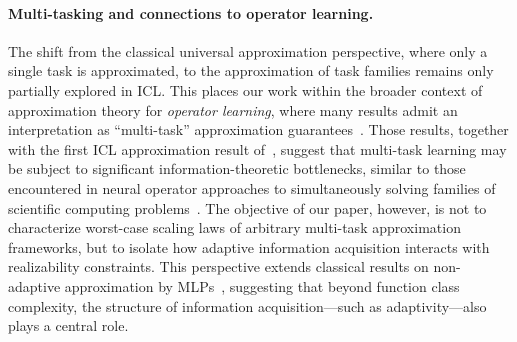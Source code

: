 \documentclass{article}
\begin{document}
\paragraph{Multi-tasking and connections to operator learning.}
The shift from the classical universal approximation perspective, where only a single task is approximated, to the approximation of task families remains only partially explored in ICL. 
This places our work within the broader context of approximation theory for \emph{operator learning}, where many results admit an interpretation as ``multi-task'' approximation guarantees~\cite{furuya2025one, KovachkiEtAl2023NeuralOperator, KovachkiLanthalerMishra2021FNOTheory, LanthalerMishraKarniadakis2022DeepONetError, kratsios2025generative, LiEtAl2021FNO}.
Those results, together with the first ICL approximation result of~\cite{li2025transformers}, suggest that multi-task learning may be subject to significant %
information-theoretic bottlenecks, %
similar to those encountered in neural operator approaches to simultaneously solving families of scientific computing problems~\cite{lanthaler2026parametric}. 
The objective of our paper, however, is not to characterize worst-case scaling laws of arbitrary multi-task approximation frameworks, but to isolate how adaptive information acquisition interacts with realizability constraints.
This perspective extends classical results on non-adaptive approximation by MLPs~\cite{Barron1993UniversalApproximation,mhaskar2017and}, suggesting that beyond function class complexity, the structure of information acquisition---such as adaptivity---also plays a central role.
\end{document}
